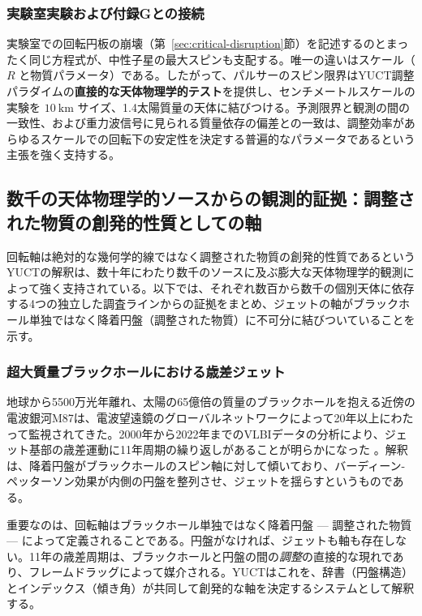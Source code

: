 \documentclass[12pt,a4paper]{article}
\begin{document}
	\subsubsection{実験室実験および付録Gとの接続}
	
	実験室での回転円板の崩壊（第~\ref{sec:critical-disruption}節）を記述するのとまったく同じ方程式が、中性子星の最大スピンも支配する。唯一の違いはスケール（\(R\) と物質パラメータ）である。したがって、パルサーのスピン限界はYUCT調整パラダイムの\textbf{直接的な天体物理学的テスト}を提供し、センチメートルスケールの実験を \(10\ \text{km}\) サイズ、1.4太陽質量の天体に結びつける。予測限界と観測の間の一致性、および重力波信号に見られる質量依存の偏差との一致は、調整効率があらゆるスケールでの回転下の安定性を決定する普遍的なパラメータであるという主張を強く支持する。
	
	\subsection{数千の天体物理学的ソースからの観測的証拠：調整された物質の創発的性質としての軸}
	
	回転軸は絶対的な幾何学的線ではなく調整された物質の創発的性質であるというYUCTの解釈は、数十年にわたり数千のソースに及ぶ膨大な天体物理学的観測によって強く支持されている。以下では、それぞれ数百から数千の個別天体に依存する4つの独立した調査ラインからの証拠をまとめ、ジェットの軸がブラックホール単独ではなく降着円盤（調整された物質）に不可分に結びついていることを示す。
	
	\subsubsection{超大質量ブラックホールにおける歳差ジェット}
	
	地球から5500万光年離れ、太陽の65億倍の質量のブラックホールを抱える近傍の電波銀河M87は、電波望遠鏡のグローバルネットワークによって20年以上にわたって監視されてきた。2000年から2022年までのVLBIデータの分析により、ジェット基部の歳差運動に11年周期の繰り返しがあることが明らかになった \cite{M87Precession2024}。解釈は、降着円盤がブラックホールのスピン軸に対して傾いており、バーディーン-ペッターソン効果が内側の円盤を整列させ、ジェットを揺らすというものである。
	
	重要なのは、回転軸はブラックホール単独ではなく降着円盤 — 調整された物質 — によって定義されることである。円盤がなければ、ジェットも軸も存在しない。11年の歳差周期は、ブラックホールと円盤の間の\textit{調整}の直接的な現れであり、フレームドラッグによって媒介される。YUCTはこれを、辞書（円盤構造）とインデックス（傾き角）が共同して創発的な軸を決定するシステムとして解釈する。
	
\end{document}
